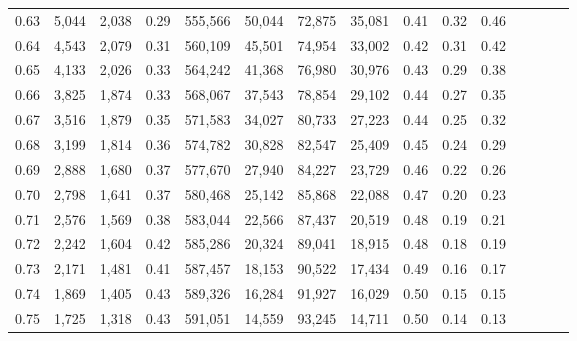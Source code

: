 \begin{tabular}{rrrcrrrrrrrrrrr}
0.63 &   5,044 &  2,038 &                                       0.29 &  555,566 &   50,044 &   72,875 &   35,081 &  0.41 &  0.32 &                         0.46 \\
0.64 &   4,543 &  2,079 &                                       0.31 &  560,109 &   45,501 &   74,954 &   33,002 &  0.42 &  0.31 &                         0.42 \\
0.65 &   4,133 &  2,026 &                                       0.33 &  564,242 &   41,368 &   76,980 &   30,976 &  0.43 &  0.29 &                         0.38 \\
0.66 &   3,825 &  1,874 &                                       0.33 &  568,067 &   37,543 &   78,854 &   29,102 &  0.44 &  0.27 &                         0.35 \\
0.67 &   3,516 &  1,879 &                                       0.35 &  571,583 &   34,027 &   80,733 &   27,223 &  0.44 &  0.25 &                         0.32 \\
0.68 &   3,199 &  1,814 &                                       0.36 &  574,782 &   30,828 &   82,547 &   25,409 &  0.45 &  0.24 &                         0.29 \\
0.69 &   2,888 &  1,680 &                                       0.37 &  577,670 &   27,940 &   84,227 &   23,729 &  0.46 &  0.22 &                         0.26 \\
0.70 &   2,798 &  1,641 &                                       0.37 &  580,468 &   25,142 &   85,868 &   22,088 &  0.47 &  0.20 &                         0.23 \\
0.71 &   2,576 &  1,569 &                                       0.38 &  583,044 &   22,566 &   87,437 &   20,519 &  0.48 &  0.19 &                         0.21 \\
0.72 &   2,242 &  1,604 &                                       0.42 &  585,286 &   20,324 &   89,041 &   18,915 &  0.48 &  0.18 &                         0.19 \\
0.73 &   2,171 &  1,481 &                                       0.41 &  587,457 &   18,153 &   90,522 &   17,434 &  0.49 &  0.16 &                         0.17 \\
0.74 &   1,869 &  1,405 &                                       0.43 &  589,326 &   16,284 &   91,927 &   16,029 &  0.50 &  0.15 &                         0.15 \\
0.75 &   1,725 &  1,318 &                                       0.43 &  591,051 &   14,559 &   93,245 &   14,711 &  0.50 &  0.14 &                         0.13 \\

\end{tabular}
